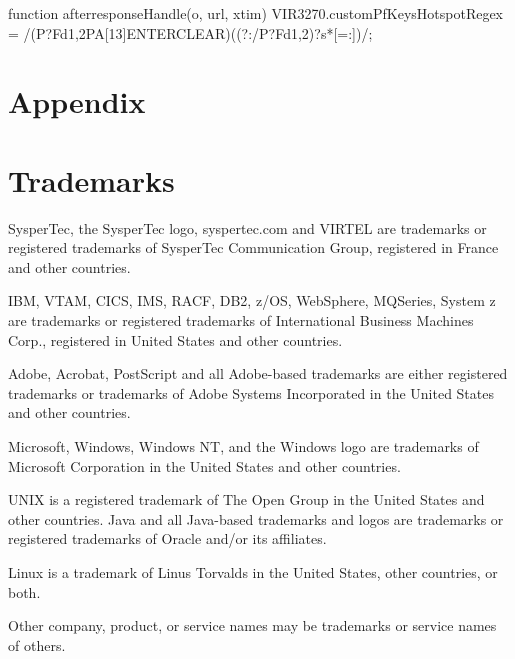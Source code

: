 \documentclass[letterpaper,10pt,english]{sphinxmanual}
\begin{document}
\begin{sphinxVerbatim}[commandchars=\\\{\}]
function after\PYGZus{}responseHandle(o, url, xtim) \PYGZob{}
VIR3270.customPfKeysHotspotRegex = /(P?F\PYGZbs{}d\PYGZob{}1,2\PYGZcb{}\textbar{}PA[1\PYGZhy{}3]\textbar{}ENTER\textbar{}CLEAR)((?:\PYGZbs{}/P?F\PYGZbs{}d\PYGZob{}1,2\PYGZcb{})?\PYGZbs{}s*[=:\PYGZhy{}])/;
\PYGZcb{}
\end{sphinxVerbatim}


\chapter{Appendix}
\label{\detokenize{Customization:appendix}}

\chapter{Trademarks}
\label{\detokenize{Customization:trademarks}}
SysperTec, the SysperTec logo, syspertec.com and VIRTEL are trademarks or registered trademarks of SysperTec
Communication Group, registered in France and other countries.

IBM, VTAM, CICS, IMS, RACF, DB2, z/OS, WebSphere, MQSeries, System z are trademarks or registered trademarks of
International Business Machines Corp., registered in United States and other countries.

Adobe, Acrobat, PostScript and all Adobe-based trademarks are either registered trademarks or trademarks of Adobe
Systems Incorporated in the United States and other countries.

Microsoft, Windows, Windows NT, and the Windows logo are trademarks of Microsoft Corporation in the United States
and other countries.

UNIX is a registered trademark of The Open Group in the United States and other countries.
Java and all Java-based trademarks and logos are trademarks or registered trademarks of Oracle and/or its affiliates.

Linux is a trademark of Linus Torvalds in the United States, other countries, or both.

Other company, product, or service names may be trademarks or service names of others.



\renewcommand{\indexname}{Index}
\printindex
\end{document}
